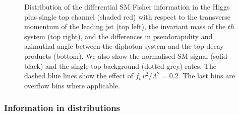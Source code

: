 \begin{figure}
  \caption{Distribution of the differential SM Fisher information in
    the Higgs plus single top channel (shaded red) with respect to the
    transverse momentum of the leading jet (top left), the invariant
    mass of the $th$ system (top right), and the differences in
    pseudorapidity and azimuthal angle between the diphoton system and
    the top decay products (bottom). We also show the normalised SM
    signal (solid black) and the single-top background (dotted grey)
    rates. The dashed blue lines show the effect of
    $f_{t} \, v^2 / \Lambda^2 = 0.2$. The last bins are overflow bins
    where applicable.}
  \label{fig:information_th_differential_information_jets}
\end{figure}




\subsubsection*{Information in distributions}

